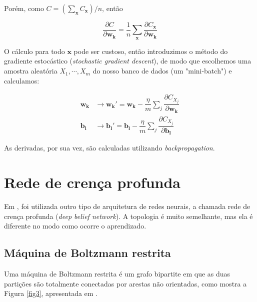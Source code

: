 \documentclass{article}
\begin{document}
            Porém, como $C = (\sum_{\mathbf{x}} C_{\mathbf{x}}) / n$, então
            
            \begin{equation}
                \dfrac{\partial C}{\partial \mathbf{w_k}} = \dfrac{1}{n} \sum_{\mathbf{x}} \dfrac{\partial C_{\mathbf{x}}}{\partial \mathbf{w_k}}
            \end{equation}
            
            O cálculo para todo $\mathbf{x}$ pode ser custoso, então introduzimos o método do gradiente estocástico (\textit{stochastic gradient descent}), de modo que escolhemos uma amostra aleatória $X_1, \cdots, X_m$ do nosso banco de dados (um "mini-batch") e calculamos:

            \begin{equation}
                \begin{split}
                    \mathbf{w_k} &\rightarrow \mathbf{w_k'} = \mathbf{w_k} - \dfrac{\eta}{m} \sum_j \dfrac{\partial C_{X_j}}{\partial \mathbf{w_k}} \\
                    \mathbf{b_l} &\rightarrow \mathbf{b_l'} = \mathbf{b_l} - \dfrac{\eta}{m} \sum_j \dfrac{\partial C_{X_j}}{\partial \mathbf{b_l}}
                \end{split}
            \end{equation}

            As derivadas, por sua vez, são calculadas utilizando \textit{backpropagation}.

    \section{Rede de crença profunda}
        \label{belief}

        Em \cite{testolin2018deep}, foi utilizada outro tipo de arquitetura de redes neurais, a chamada rede de crença profunda (\textit{deep belief network}).
        A topologia é muito semelhante, mas ela é diferente no modo como ocorre o aprendizado.

        \subsection{Máquina de Boltzmann restrita}

            Uma máquina de Boltzmann restrita é um grafo bipartite em que as duas partições são totalmente conectadas por arestas não orientadas, como mostra a Figura \ref{fig3}, apresentada em \cite{testolin2018deep}.
\end{document}
